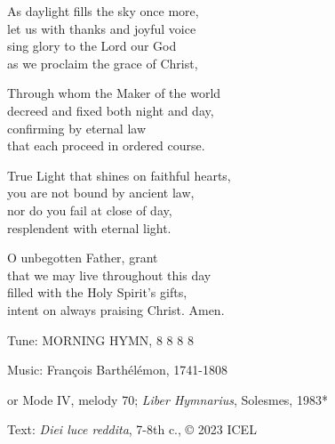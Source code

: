 \hymn

\begin{hymnverse}
As daylight fills the sky once more,\\
let us with thanks and joyful voice\\
sing glory to the Lord our God\\
as we proclaim the grace of Christ,

Through whom the Maker of the world\\
decreed and fixed both night and day,\\
confirming by eternal law\\
that each proceed in ordered course.

True Light that shines on faithful hearts,\\
you are not bound by ancient law,\\
nor do you fail at close of day,\\
resplendent with eternal light.

O unbegotten Father, grant\\
that we may live throughout this day\\
filled with the Holy Spirit’s gifts,\\
intent on always praising Christ. Amen.
\end{hymnverse}

\begin{hymnsource}
Tune: MORNING HYMN, 8 8 8 8

Music: François Barthélémon, 1741-1808

or Mode IV, melody 70; \emph{Liber Hymnarius}, Solesmes, 1983*

Text: \emph{Diei luce reddita}, 7-8th c., © 2023 ICEL
\end{hymnsource}